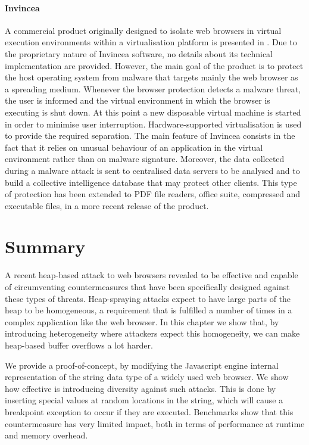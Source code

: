 \paragraph{Invincea}
A commercial product originally designed to isolate web browsers in virtual execution environments within a virtualisation platform is presented in \cite{invincea}.
Due to the proprietary nature of Invincea software, no details about its technical implementation are provided.
However, the main goal of the product is to protect the host operating system from malware that targets mainly the web browser as a spreading medium. Whenever the browser protection detects a malware threat, the user is informed and the virtual environment in which the browser is executing is shut down. At this point a new disposable virtual machine is started in order to minimise user interruption. Hardware-supported virtualisation is used to provide the required separation.
The main feature of Invincea consists in the fact that it relies on unusual behaviour of an application in the virtual environment rather than on malware signature. Moreover, the data collected during a malware attack is sent to centralised data servers to be analysed and to build a collective intelligence database that may protect other clients.
This type of protection has been extended to PDF file readers, office suite, compressed and executable files, in a more recent release of the product. 


\section{Summary} \label{bub:conclusion}
A recent heap-based attack to web browsers revealed to be effective and capable of circumventing countermeasures that have been specifically designed against these types of threats. 
Heap-spraying attacks expect to have large parts of the heap to be homogeneous, a requirement that is fulfilled a number of times in a complex application like the web browser. 
In this chapter we show that, by introducing heterogeneity where attackers expect this homogeneity, we can make heap-based buffer overflows a lot harder. 

We provide a proof-of-concept, by modifying the Javascript engine internal representation of the string data type of a widely used web browser. We show how effective is introducing diversity against such attacks. This is done by inserting special values at random locations in the string, which will cause a breakpoint exception to occur if they are executed. 
Benchmarks show that this countermeasure has very limited impact, both in terms of performance at runtime and memory overhead.


